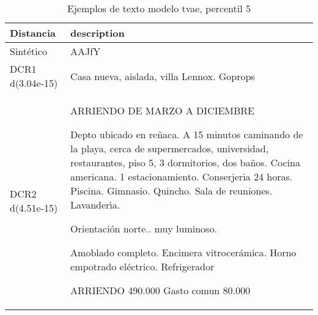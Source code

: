 \begin{table}[H]
\centering
\fontsize{10}{14}\selectfont
\caption{Ejemplos de texto modelo tvae, percentil 5}
\label{table-example-economicos-b-1-tvae-5p-text}
\begin{tabular}{|l|m{35em}|}
\hline
\rowcolor[gray]{0.8}
Distancia & description \\
\hline Sintético & AAJfY \\
\hline DCR1 d(3.04e-15) & Casa nueva, aislada, villa Lennox. Goprops \\
\hline DCR2 d(4.51e-15) & ARRIENDO DE MARZO A DICIEMBRE

Depto ubicado en re\~naca. A 15 minutos caminando de la playa, cerca de supermercados, universidad, restaurantes, piso 5, 3 dormitorios, dos ba\~nos. Cocina americana. 1 estacionamiento. Conserjeria 24 horas. Piscina. Gimnasio. Quincho. Sala de reuniones. Lavander{\'\i}a.

Orientaci\'on norte.. muy luminoso.

Amoblado completo. Encimera vitrocer\'amica. Horno empotrado el\'ectrico. Refrigerador

ARRIENDO 490.000
Gasto comun 80.000 \\
\hline
\end{tabular}
\end{table}
